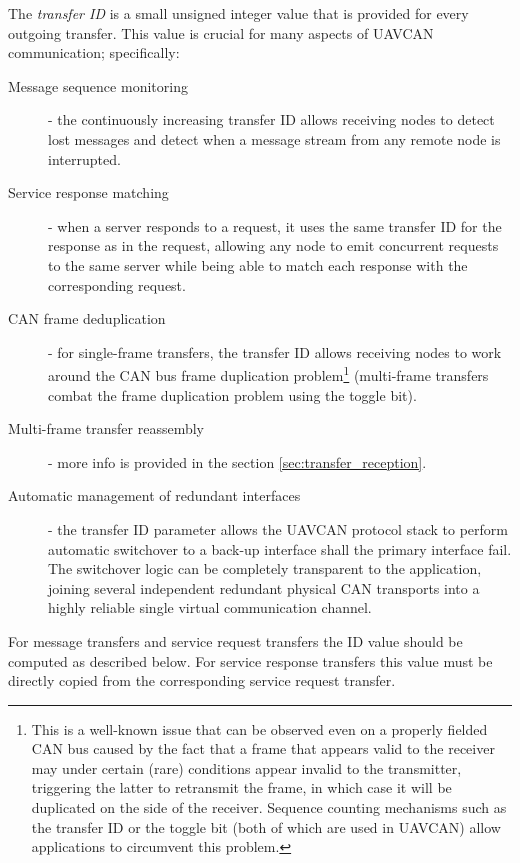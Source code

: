 The \emph{transfer ID} is a small unsigned integer value that is provided for every outgoing
transfer.
This value is crucial for many aspects of UAVCAN communication; specifically:
\begin{description}
    \item[Message sequence monitoring] - the continuously increasing transfer ID allows receiving nodes to
    detect lost messages and detect when a message stream from any remote node is interrupted.

    \item[Service response matching] - when a server responds to a request, it uses the same transfer ID for the
    response as in the request,
    allowing any node to emit concurrent requests to the same server while being able to
    match each response with the corresponding request.

    \item[CAN frame deduplication] - for single-frame transfers,
    the transfer ID allows receiving nodes to work around the CAN bus
    frame duplication problem\footnote{This is a well-known issue that can be observed even on a properly
    fielded CAN bus caused by the fact that a frame that appears valid to the receiver may under certain
    (rare) conditions appear invalid to the transmitter, triggering the latter to retransmit the frame,
    in which case it will be duplicated on the side of the receiver.
    Sequence counting mechanisms such as the transfer ID or the toggle bit (both of which are used in UAVCAN)
    allow applications to circumvent this problem.} (multi-frame transfers combat the frame duplication
    problem using the toggle bit).

    \item[Multi-frame transfer reassembly] - more info is provided in the section \ref{sec:transfer_reception}.

    \item[Automatic management of redundant interfaces] - the transfer ID parameter allows the UAVCAN protocol
    stack to perform automatic switchover to a back-up interface shall the primary interface fail.
    The switchover logic can be completely transparent to the application, joining several independent
    redundant physical CAN transports into a highly reliable single virtual communication channel.
\end{description}

For message transfers and service request transfers the ID value should be computed as described below.
For service response transfers this value must be directly copied from the corresponding service request transfer.

